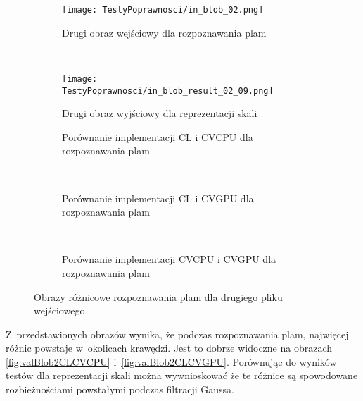 \begin{figure}[h]
\begin{center}
\begin{subfigure}[t]{0.3\textwidth}
\texttt{[image: TestyPoprawnosci/in\_blob\_02.png]}
\caption{Drugi obraz wejściowy dla rozpoznawania plam}
\label{fig:valBlob02}
\end{subfigure}
~
\begin{subfigure}[t]{0.3\textwidth}
\texttt{[image: TestyPoprawnosci/in\_blob\_result\_02\_09.png]}
\caption{Drugi obraz wyjściowy dla reprezentacji skali}
\label{fig:valBlobResult02}
\end{subfigure}
\end{center}


\begin{subfigure}[t]{0.3\textwidth}
	\centering
	\setlength\fboxsep{0pt}
	\setlength\fboxrule{0.5pt}
	\caption{Porównanie implementacji CL i CVCPU dla rozpoznawania plam}
	\label{fig:valBlob3CLCVCPU}
\end{subfigure}
~
\begin{subfigure}[t]{0.3\textwidth}
	\centering
	\setlength\fboxsep{0pt}
	\setlength\fboxrule{0.5pt}
	\caption{Porównanie implementacji CL i CVGPU dla rozpoznawania plam}
	\label{fig:valBlob3CLCVGPU}
\end{subfigure}
~
\begin{subfigure}[t]{0.3\textwidth}
	\centering
	\setlength\fboxsep{0pt}
	\setlength\fboxrule{0.5pt}
	\caption{Porównanie implementacji CVCPU i CVGPU dla rozpoznawania plam}
	\label{fig:valBlob3CVCPUCVGPU}                 
\end{subfigure}
\caption{Obrazy różnicowe rozpoznawania plam dla drugiego pliku wejściowego}

\label{fig:valBlob2}
\end{figure}

Z~przedstawionych obrazów wynika, że podczas rozpoznawania plam, najwięcej różnic powstaje w~okolicach krawędzi. Jest to dobrze widoczne na obrazach \ref{fig:valBlob2CLCVCPU} i~\ref{fig:valBlob2CLCVGPU}. Porównując do wyników testów dla reprezentacji skali można wywnioskować że te różnice są spowodowane rozbieżnościami powstałymi podczas filtracji Gaussa.

